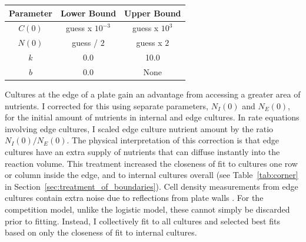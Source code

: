 \begin{center}
  \begin{tabular}{| c | c c |}
    \hline
    Parameter        & Lower Bound  & Upper Bound \\
    \hline
    \(C(0)\)     & guess x \(10^{-3}\)  & guess x \(10^{3}\)\\
    \(N(0)\)     & guess / \(2\)  & guess x \(2\)\\
    \(k\)        & 0.0    & 10.0\\
    \(b\)           & 0.0    & None \\
    \hline
  \end{tabular}
  \label{tab:p15_bounds}
\end{center}

Cultures at the edge of a plate gain an advantage from accessing a
greater area of nutrients. I corrected for this using separate
parameters, \(N_{I}(0)\) and \(N_{E}(0)\), for the initial amount of
nutrients in internal and edge cultures. In rate equations involving
edge cultures, I scaled edge culture nutrient amount by the ratio
\(N_{I}(0)/N_{E}(0)\). The physical interpretation of this correction
is that edge cultures have an extra supply of nutrients that can
diffuse instantly into the reaction volume. This treatment increased
the closeness of fit to cultures one row or column inside the edge,
and to internal cultures overall (see Table~\ref{tab:corner} in
Section~\ref{sec:treatment_of_boundaries}). Cell density measurements
from edge cultures contain extra noise due to reflections from plate
walls \citep{Lawless2010}. For the competition model, unlike the
logistic model, these cannot simply be discarded prior to
fitting. Instead, I collectively fit to all cultures and selected best
fits based on only the closeness of fit to internal cultures.


